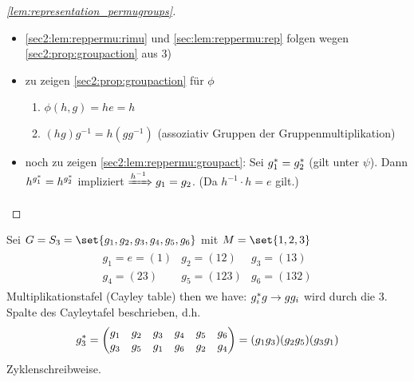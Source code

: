 \begin{proof}[\cref{lem:representation_permugroups}]
	\begin{itemize}
		\item \cref{sec2:lem:reppermu:rimu} und \cref{sec:lem:reppermu:rep} folgen wegen \cref{sec2:prop:groupaction} aus 3)
		\item zu zeigen \cref{sec2:prop:groupaction} für $\phi$
		\begin{enumerate}
			\item $\phi(h,g) = he = h$
			\item $(hg)g^{-1} = h(gg^{-1})$ (assoziativ Gruppen der Gruppenmultiplikation)
		\end{enumerate}
		\item noch zu zeigen \cref{sec2:lem:reppermu:groupact}: Sei $g^{\ast}_1 = g^{\ast}_2$ (gilt unter $\psi$). Dann $h^{g^{\ast}_1} = h^{g^{\ast}_2}$ impliziert $\xRightarrow{h^{-1}} g_1 = g_2$. (Da $h^{-1} \cdot h = e$ gilt.)
	\end{itemize}
\end{proof}
\begin{example}
	Sei $G = S_3 = \set{g_1, g_2, g_3, g_4, g_5, g_6}$ mit $M = \set{1,2,3}$
	\begin{align*}
		\begin{matrix}
			g_1 = e = (1) & g_2 = (12) & g_3 = (13)\\
			g_4 = (23) & g_5 = (123)  & g_6 = (132)
		\end{matrix}
	\end{align*}
	Multiplikationstafel (Cayley table)
	then we have: $g^{\ast}_i g \to gg_i$ wird durch die 3. Spalte des Cayleytafel beschrieben, d.h.
	\begin{align*}
		g^{\ast}_3 = \begin{pmatrix}
			g_1 & g_2 & g_3 & g_4 & g_5 & g_6\\
			g_3 & g_5 & g_1 & g_6 & g_2 & g_4
		\end{pmatrix} = (g_1 g_3)(g_2 g_5)(g_3 g_1)
	\end{align*}
	Zyklenschreibweise.
\end{example}
